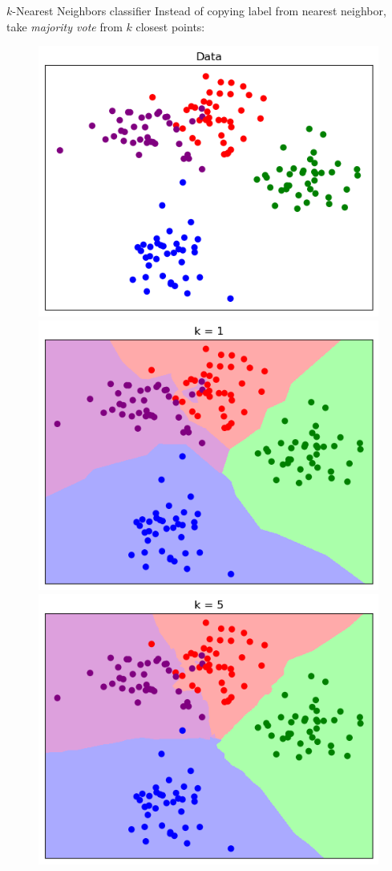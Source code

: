 \documentclass[dvipsnames]{beamer}
\begin{document}
\begin{frame}{$k$-Nearest Neighbors classifier}
Instead of copying label from nearest neighbor, take \emph{majority vote} from $k$ closest points: %
\begin{figure}
\includegraphics[scale=.33]{figures/k_nn_data.png}
\includegraphics[scale=.33]{figures/k_nn_boundary_k1.png}
\includegraphics[scale=.33]{figures/k_nn_boundary_k5.png}

\end{figure}
\end{frame}
\end{document}
